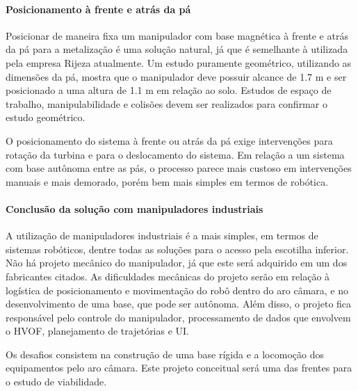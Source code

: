 \paragraph{Posicionamento à frente e atrás da pá}

Posicionar de maneira fixa um manipulador com base magnética à frente e atrás da
pá para a metalização é uma solução natural, já que é semelhante à utilizada pela
empresa Rijeza atualmente. Um estudo puramente geométrico, utilizando as
dimensões da pá, mostra que o manipulador deve possuir alcance de 1.7 m e ser
posicionado a uma altura de 1.1 m em relação ao solo. Estudos de espaço de
trabalho, manipulabilidade e colisões devem ser realizados para confirmar o
estudo geométrico.

O posicionamento do sistema à frente ou atrás da pá exige intervenções para
rotação da turbina e para o deslocamento do sistema. Em relação a um
sistema com base autônoma entre as pás, o processo parece mais custoso em
intervenções manuais e mais demorado, porém bem mais simples em termos de
robótica.

\paragraph{Conclusão da solução com manipuladores industriais}
A utilização de manipuladores industriais é a mais simples, em termos de
sistemas robóticos, dentre todas as soluções para o acesso pela escotilha
inferior.
Não há projeto mecânico do manipulador, já que este será adquirido em um dos fabricantes citados. As dificuldades mecânicas do projeto serão em relação à logística de posicionamento
e movimentação do robô dentro do aro câmara, e no desenvolvimento de uma base,
que pode ser autônoma. Além disso, o projeto fica responsável pelo controle do
manipulador, processamento de dados que envolvem o HVOF, planejamento de
trajetórias e UI.

Os desafios consistem na construção de uma base rígida e a locomoção dos
equipamentos pelo aro câmara. Este projeto conceitual será uma das frentes para
o estudo de viabilidade.
